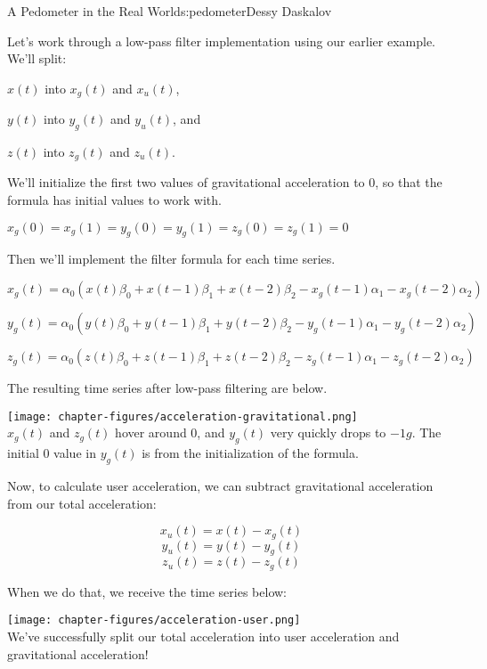 \begin{aosachapter}{A Pedometer in the Real World}{s:pedometer}{Dessy Daskalov}
\label{implementing-a-low-pass-filter}

Let's work through a low-pass filter implementation using our earlier
example. We'll split:

\begin{aosaitemize}

\item
  $x(t)$ into $x_{g}(t)$ and $x_{u}(t)$,
\item
  $y(t)$ into $y_{g}(t)$ and $y_{u}(t)$, and
\item
  $z(t)$ into $z_{g}(t)$ and $z_{u}(t)$.
\end{aosaitemize}

We'll initialize the first two values of gravitational acceleration to
0, so that the formula has initial values to work with.

$x_{g}(0) = x_{g}(1) = y_{g}(0) = y_{g}(1) = z_{g}(0) = z_{g}(1) = 0$

Then we'll implement the filter formula for each time series.

$x_{g}(t) = \alpha_{0}(x(t)\beta_{0} + x(t-1)\beta_{1} + x(t-2)\beta_{2} - x_{g}(t-1)\alpha_{1} - x_{g}(t-2)\alpha_{2})$

$y_{g}(t) = \alpha_{0}(y(t)\beta_{0} + y(t-1)\beta_{1} + y(t-2)\beta_{2} - y_{g}(t-1)\alpha_{1} - y_{g}(t-2)\alpha_{2})$

$z_{g}(t) = \alpha_{0}(z(t)\beta_{0} + z(t-1)\beta_{1} + z(t-2)\beta_{2} - z_{g}(t-1)\alpha_{1} - z_{g}(t-2)\alpha_{2})$

The resulting time series after low-pass filtering are below.

\texttt{[image: chapter-figures/acceleration-gravitational.png]}\\
$x_{g}(t)$ and $z_{g}(t)$ hover around 0, and $y_{g}(t)$ very quickly
drops to $-1g$. The initial 0 value in $y_{g}(t)$ is from the
initialization of the formula.

Now, to calculate user acceleration, we can subtract gravitational
acceleration from our total acceleration:

\[
x_{u}(t) = x(t) - x_{g}(t)
\] \[
y_{u}(t) = y(t) - y_{g}(t)
\] \[
z_{u}(t) = z(t) - z_{g}(t)
\]

When we do that, we receive the time series below:

\texttt{[image: chapter-figures/acceleration-user.png]}\\ We've
successfully split our total acceleration into user acceleration and
gravitational acceleration!


\end{aosachapter}
